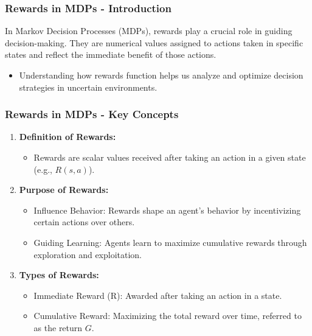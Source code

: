 \documentclass[aspectratio=169]{beamer}
\begin{document}
\begin{frame}[fragile]
    \frametitle{Rewards in MDPs - Introduction}
    In Markov Decision Processes (MDPs), rewards play a crucial role in guiding decision-making. They are numerical values assigned to actions taken in specific states and reflect the immediate benefit of those actions. 
    \begin{itemize}
        \item Understanding how rewards function helps us analyze and optimize decision strategies in uncertain environments.
    \end{itemize}
\end{frame}

\begin{frame}[fragile]
    \frametitle{Rewards in MDPs - Key Concepts}
    \begin{enumerate}
        \item \textbf{Definition of Rewards:}
        \begin{itemize}
            \item Rewards are scalar values received after taking an action in a given state (e.g., \( R(s, a) \)).
        \end{itemize}
        
        \item \textbf{Purpose of Rewards:}
        \begin{itemize}
            \item Influence Behavior: Rewards shape an agent's behavior by incentivizing certain actions over others.
            \item Guiding Learning: Agents learn to maximize cumulative rewards through exploration and exploitation.
        \end{itemize}
        
        \item \textbf{Types of Rewards:}
        \begin{itemize}
            \item Immediate Reward (R): Awarded after taking an action in a state.
            \item Cumulative Reward: Maximizing the total reward over time, referred to as the return \( G \).
        \end{itemize}
    \end{enumerate}
\end{frame}
\end{document}
